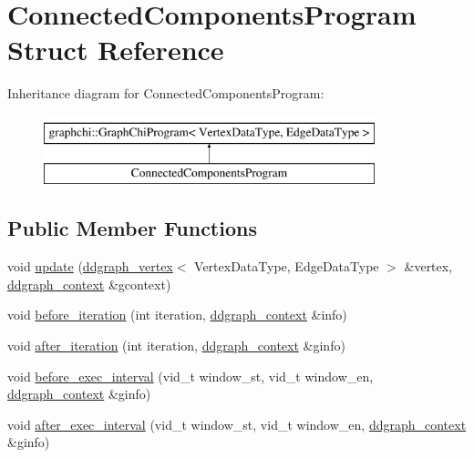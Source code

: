 \hypertarget{struct_connected_components_program}{\section{Connected\-Components\-Program Struct Reference}
\label{struct_connected_components_program}
}
Inheritance diagram for Connected\-Components\-Program\-:\begin{figure}[H]
\begin{center}
\leavevmode
\includegraphics[height=2.000000cm]{struct_connected_components_program}
\end{center}
\end{figure}
\subsection*{Public Member Functions}
\begin{DoxyCompactItemize}
\item 
void \hyperlink{struct_connected_components_program_a31f583b07a3882bb1c231070d2f430c2}{update} (\hyperlink{classddgraph_1_1ddgraph__vertex}{ddgraph\-\_\-vertex}$<$ Vertex\-Data\-Type, Edge\-Data\-Type $>$ \&vertex, \hyperlink{structddgraph_1_1ddgraph__context}{ddgraph\-\_\-context} \&gcontext)
\item 
void \hyperlink{struct_connected_components_program_aae6274665671c137878968c6714cfdcf}{before\-\_\-iteration} (int iteration, \hyperlink{structddgraph_1_1ddgraph__context}{ddgraph\-\_\-context} \&info)
\item 
void \hyperlink{struct_connected_components_program_acfee1eaafacf9a197b17fefb365914ba}{after\-\_\-iteration} (int iteration, \hyperlink{structddgraph_1_1ddgraph__context}{ddgraph\-\_\-context} \&ginfo)
\item 
void \hyperlink{struct_connected_components_program_ab8720ed99bd8d2bc555e8e545a48a858}{before\-\_\-exec\-\_\-interval} (vid\-\_\-t window\-\_\-st, vid\-\_\-t window\-\_\-en, \hyperlink{structddgraph_1_1ddgraph__context}{ddgraph\-\_\-context} \&ginfo)
\item 
void \hyperlink{struct_connected_components_program_ac7970431691b01689a29cee5f0baa759}{after\-\_\-exec\-\_\-interval} (vid\-\_\-t window\-\_\-st, vid\-\_\-t window\-\_\-en, \hyperlink{structddgraph_1_1ddgraph__context}{ddgraph\-\_\-context} \&ginfo)
\end{DoxyCompactItemize}
